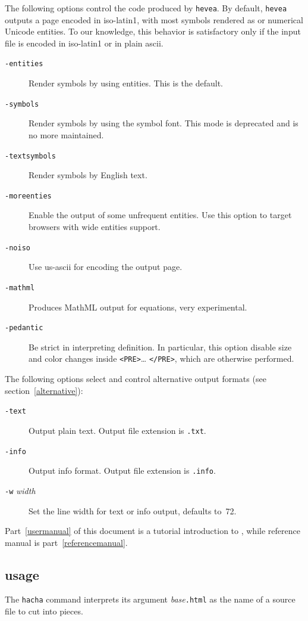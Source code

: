 The following options control the {\html} code produced by
\texttt{hevea}. By default, \texttt{hevea} outputs a page encoded in
iso-latin1, with most symbols rendered as {\html} or numerical Unicode
entities. To our knowledge, this behavior is satisfactory only if the
input file is encoded in iso-latin1 or in plain ascii.
\begin{description}
\item[{\tt -entities}] Render symbols by using entities. This is the default.
\item[{\tt -symbols}] Render symbols by using the symbol font. This
mode is deprecated and is no more maintained.
\item[{\tt -textsymbols}] Render symbols by English text.
\item[{\tt -moreenties}] Enable the output of some unfrequent entities. Use
this option to target browsers with wide entities support.
\item[{\tt -noiso}] Use us-ascii for encoding the output page.
\item[{\tt -mathml}] Produces MathML output for equations, very
experimental.
\item[{\tt -pedantic}]  Be strict in interpreting \html{}
definition. In particular, this option disable size and color changes inside
\verb+<PRE>+\ldots{} \verb+</PRE>+, which are otherwise performed.
\end{description}

The following options select and control alternative output formats
(see section~\ref{alternative}):
\begin{description}
\item[{\tt -text}] Output plain text. Output file
extension is \texttt{.txt}.
\item[{\tt -info}] Output info format. Output file extension
is \texttt{.info}.
\item[{\tt -w} {\it width}] Set the line width for text or info
output, defaults to~72.
\end{description}

Part~\ref{usermanual} of this document is
a tutorial introduction to \hevea{},
while \hevea{} reference manual is part~\ref{referencemanual}.


\subsection{\hacha{} usage}
The \texttt{hacha} command interprets its argument
\textit{base}\texttt{.html} as the name of
a \html{} source file to cut into pieces.

